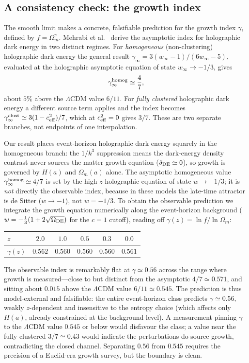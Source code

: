 \documentclass[twocolumn,10pt]{article}
\begin{document}
\subsection{A consistency check: the growth index}
\label{sec:pert-gamma}

The smooth limit makes a concrete, falsifiable prediction for the growth index
$\gamma$, defined by $f=\Omega_m^\gamma$. Mehrabi et al.~\cite{Mehrabi2015}
derive the asymptotic index for holographic dark energy in two distinct
regimes. For \emph{homogeneous} (non-clustering) holographic dark energy the
general result $\gamma_\infty=3(w_\infty-1)/(6w_\infty-5)$, evaluated at the
holographic asymptotic equation of state $w_\infty\to-1/3$, gives
\begin{equation}
\gamma_\infty^{\rm homog}\simeq\frac{4}{7},
\end{equation}
about $5\%$ above the $\Lambda$CDM value $6/11$. For \emph{fully clustered}
holographic dark energy a different source term applies and the index becomes
$\gamma_\infty^{\rm clust}\simeq3(1-c_{\rm eff}^2)/7$, which at $c_{\rm eff}^2=0$
gives $3/7$. These are two separate branches, not endpoints of one
interpolation.

Our result places event-horizon holographic dark energy squarely in the
homogeneous branch: the $1/k^3$ suppression means the dark-energy density
contrast never sources the matter growth equation ($\delta_{\rm DE}\simeq0$),
so growth is governed by $H(a)$ and $\Omega_m(a)$ alone. The asymptotic
homogeneous value $\gamma_\infty^{\rm homog}\simeq4/7$ is set by the high-$z$
holographic equation of state $w\to-1/3$; it is \emph{not} directly the
observable index, because in these models the late-time attractor is de Sitter
($w\to-1$), not $w=-1/3$. To obtain the observable prediction we integrate the
growth equation numerically along the event-horizon background
($w=-\tfrac13(1+2\sqrt{\Omega_{\rm DE}})$ for the $c=1$ cutoff), reading off
$\gamma(z)=\ln f/\ln\Omega_m$:
\begin{center}
\begin{tabular}{lccccc}
$z$ & $2.0$ & $1.0$ & $0.5$ & $0.3$ & $0.0$ \\ \hline
$\gamma(z)$ & $0.562$ & $0.560$ & $0.560$ & $0.560$ & $0.561$ \\
\end{tabular}
\end{center}
The observable index is remarkably flat at $\gamma\simeq0.56$ across the range
where growth is measured---close to but distinct from the asymptotic $4/7\simeq
0.571$, and sitting about $0.015$ above the $\Lambda$CDM value $6/11\simeq
0.545$. The prediction is thus model-external and falsifiable: the entire
event-horizon class predicts $\gamma\simeq0.56$, weakly $z$-dependent and
insensitive to the entropy choice (which affects only $H(a)$, already
constrained at the background level). A measurement pinning $\gamma$ to the
$\Lambda$CDM value $0.545$ or below would disfavour the class; a value near the
fully clustered $3/7\simeq0.43$ would indicate the perturbations do source
growth, contradicting the closed channel. Separating $0.56$ from $0.545$
requires the precision of a Euclid-era growth survey, but the boundary is
clean.
\end{document}
